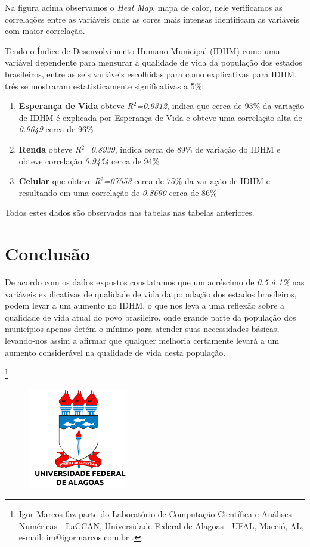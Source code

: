 \documentclass[10pt,foldmark,notumble]{leaflet}
\begin{document}
Na figura acima observamos o \emph{Heat Map}, mapa de calor, nele verificamos as correlações entre as variáveis onde as cores mais intensas identificam as variáveis com maior correlação.

Tendo o Índice de Desenvolvimento Humano Municipal (IDHM) como uma variável dependente para mensurar a qualidade de vida da população dos estados brasileiros, entre as seis variáveis escolhidas para como explicativas para IDHM, três se mostraram estatisticamente significativas a 5\%: 
\begin{enumerate}
\item {\textbf{Esperança de Vida} obteve \emph{R$^2$=0.9312}, indica que cerca de 93\% da variação de IDHM é explicada por Esperança de Vida e obteve uma correlação alta de \emph{0.9649} cerca de 96\%}
\item {\textbf{Renda} obteve \emph{R$^2$=0.8939}, indica cerca de 89\% de variação do IDHM e obteve correlação \emph{0.9454} cerca de 94\%}
\item {\textbf{Celular} que obteve \emph{R$^2$=07553} cerca de 75\% da variação de IDHM e resultando em uma correlação de \emph{0.8690} cerca de 86\%}
\end{enumerate}
Todos estes dados são observados nas tabelas nas tabelas anteriores.

\section{Conclusão}

De acordo com os dados expostos constatamos que um acréscimo de \emph{0.5 à 1\%} nas variáveis explicativas de qualidade de vida da população dos estados brasileiros, podem levar a um aumento no IDHM, o que nos leva a uma reflexão sobre a qualidade de vida atual do povo brasileiro, onde grande parte da população dos municípios apenas detém o mínimo para atender suas necessidades básicas, levando-nos assim a afirmar que qualquer melhoria certamente levará a um aumento considerável na qualidade de vida desta população.


\vspace{60pt}
\footnote{Igor Marcos faz parte do Laboratório de Computação Científica e Análises Numéricas - LaCCAN, Universidade Federal de Alagoas - UFAL, Maceió,
AL, e-mail: im@igormarcos.com.br .}
\nocite{Haq1995}
\nocite{Licia2009}
\nocite{loureiroimpacto}
\nocite{Liana2015}
\nocite{Luciana2007}
\nocite{Ferreira2015}
\nocite{Cruz2016}
\nocite{Ipea2017}
\nocite{IBGE2017}
\nocite{Atlas2017}
\nocite{PNUD2017}
\nocite{FBSP2017}
\nocite{RepoIgor2017}
\pagebreak

\textcolor{white}{
\footnotesize{
		
		
	}
   }
\vspace{40pt}
\begin{figure}[H]
\center
{\includegraphics[scale=0.9]{Images/aau_logo_new_circle-UFAL.pdf}}
\label{UFAL}
\end{figure}
\end{document}

